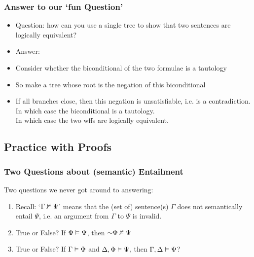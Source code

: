\begin{frame}
\frametitle{Answer to our `fun Question'}

\begin{itemize}[<+->]

\item Question: how can you use a single tree to show that two sentences are logically equivalent?

\item Answer:

\item Consider whether the biconditional of the two formulae is a tautology 

\item So make a tree whose root is the negation of this biconditional

\item If all branches close, then this negation is unsatisfiable, i.e. is a contradiction. In which case the biconditional is a tautology. \\ In which case the two wffs are logically equivalent. 


\end{itemize}
\end{frame}



\subsection{Practice with Proofs}

\begin{frame}
\frametitle{Two Questions about (semantic) Entailment}

Two questions we never got around to answering: 

\medskip 

\begin{enumerate}[<+->]

\item[] Recall: `$\Gamma \nvDash \Psi$' means that the (set of) sentence(s) $\Gamma$ does not semantically entail $\Psi$, i.e. an argument from $\Gamma$ to $\Psi$ is invalid. 

\item True or False? If $\Phi \vDash \Psi$, then $\enot \Phi \nentails \Psi$ 

\bigskip

\item True or False? If $\Gamma \vDash \Phi$ and $\Delta, \Phi \vDash \Psi$, then $\Gamma, \Delta \vDash \Psi$? 

\end{enumerate}

\end{frame}

